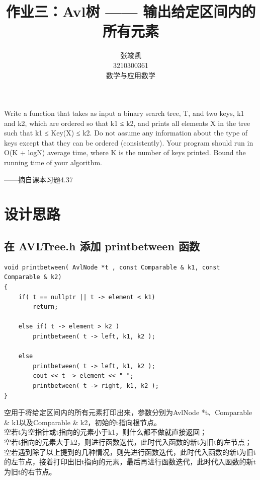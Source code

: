 \documentclass[UTF8]{ctexart}
\title{作业三：Avl树 —— 输出给定区间内的所有元素}
\author{张竣凯 \\ 3210300361 \\ 数学与应用数学}
\begin{document}
\maketitle

Write a function that takes as input a binary search tree, T, and two keys, k1 and k2,
which are ordered so that k1 ≤ k2, and prints all elements X in the tree such that
k1 ≤ Key(X) ≤ k2. Do not assume any information about the type of keys except
that they can be ordered (consistently). Your program should run in O(K + logN)
average time, where K is the number of keys printed. Bound the running time of
your algorithm.

\begin{flushright}
——摘自课本习题4.37
\end{flushright}

\section{设计思路}

\subsection{在 AVLTree.h 添加 printbetween 函数}

\begin{lstlisting}[language={[ANSI]C++}]
void printbetween( AvlNode *t , const Comparable & k1, const Comparable & k2)
{
    if( t == nullptr || t -> element < k1)
        return;
        
    else if( t -> element > k2 )
        printbetween( t -> left, k1, k2 );
    
    else
        printbetween( t -> left, k1, k2 );
        cout << t -> element << " ";
        printbetween( t -> right, k1, k2 );
}
\end{lstlisting}

\hphantom 空用于将给定区间内的所有元素打印出来，参数分别为AvlNode *t、Comparable \& k1以及Comparable \& k2，初始的t指向根节点。\\

\hphantom 空若t为空指针或t指向的元素小于k1，则什么都不做就直接返回；\\

\hphantom 空若t指向的元素大于k2，则进行函数迭代，此时代入函数的新t为旧t的左节点；\\

\hphantom 空若遇到除了以上提到的几种情况，则先进行函数迭代，此时代入函数的新t为旧t的左节点，接着打印出旧t指向的元素，最后再进行函数迭代，此时代入函数的新t为旧t的右节点。
\end{document}
